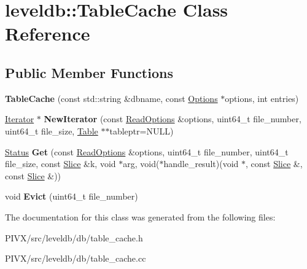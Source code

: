 \hypertarget{classleveldb_1_1_table_cache}{}\section{leveldb\+:\+:Table\+Cache Class Reference}
\label{classleveldb_1_1_table_cache}
\subsection*{Public Member Functions}
\begin{DoxyCompactItemize}
\item 
\mbox{\label{classleveldb_1_1_table_cache_acca8df0a6305b166a7c88f27d1b3e377}} 
{\bfseries Table\+Cache} (const std\+::string \&dbname, const \mbox{\hyperlink{structleveldb_1_1_options}{Options}} $\ast$options, int entries)
\item 
\mbox{\label{classleveldb_1_1_table_cache_afe8c83b1cbbf3bfc06c66a69611aa250}} 
\mbox{\hyperlink{classleveldb_1_1_iterator}{Iterator}} $\ast$ {\bfseries New\+Iterator} (const \mbox{\hyperlink{structleveldb_1_1_read_options}{Read\+Options}} \&options, uint64\+\_\+t file\+\_\+number, uint64\+\_\+t file\+\_\+size, \mbox{\hyperlink{classleveldb_1_1_table}{Table}} $\ast$$\ast$tableptr=N\+U\+LL)
\item 
\mbox{\label{classleveldb_1_1_table_cache_af43ba38b52742e9f5589321747535444}} 
\mbox{\hyperlink{classleveldb_1_1_status}{Status}} {\bfseries Get} (const \mbox{\hyperlink{structleveldb_1_1_read_options}{Read\+Options}} \&options, uint64\+\_\+t file\+\_\+number, uint64\+\_\+t file\+\_\+size, const \mbox{\hyperlink{classleveldb_1_1_slice}{Slice}} \&k, void $\ast$arg, void($\ast$handle\+\_\+result)(void $\ast$, const \mbox{\hyperlink{classleveldb_1_1_slice}{Slice}} \&, const \mbox{\hyperlink{classleveldb_1_1_slice}{Slice}} \&))
\item 
\mbox{\label{classleveldb_1_1_table_cache_a57b81c58ff0533514b3a5d1652f044bc}} 
void {\bfseries Evict} (uint64\+\_\+t file\+\_\+number)
\end{DoxyCompactItemize}


The documentation for this class was generated from the following files\+:\begin{DoxyCompactItemize}
\item 
P\+I\+V\+X/src/leveldb/db/table\+\_\+cache.\+h\item 
P\+I\+V\+X/src/leveldb/db/table\+\_\+cache.\+cc\end{DoxyCompactItemize}
